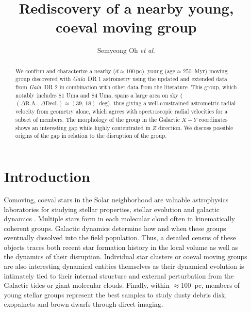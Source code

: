 \documentclass[modern,letterpaper]{aastex61}
\newcommand{\project}[1]{\textsl{#1}}
\newcommand{\gaia}{\project{Gaia}}
\newcommand{\etal}{\textit{et al}.}
\newcommand{\groupDistanceEstimate}{\ensuremath{100~\mathrm{pc}}}
\begin{document}
\sloppy\sloppypar\raggedbottom\frenchspacing %

\title{
  Rediscovery of a nearby young, coeval moving group
}

\author[0000-0001-7790-5308]{Semyeong Oh \etal}


\begin{abstract}

  We confirm and characterize a nearby ($d \approx \groupDistanceEstimate$),
  young (age$\approx 250$~Myr) moving group discovered with \gaia\ DR 1
  astrometry using the updated and extended data from \gaia\ DR 2 in combination
  with other data from the literature.
  This group, which notably includes 81 Uma and 84 Uma, spans a large area
  on sky ($(\Delta\mathrm{R.A.},\,\Delta\mathrm{Decl.})\approx(39,\,18)$~deg),
  thus giving a well-constrained astrometric radial velocity from geometry alone,
  which agrees with spectroscopic radial velocities for a subset of members.
  The morphology of the group in the Galactic $X-Y$ coordinates shows an
  interesting gap while highly contentrated in $Z$ direction.
  We discuss possible origins of the gap in relation to the disruption of the group.

\end{abstract}

\section{Introduction} %
\label{sec:introduction}

Comoving, coeval stars in the Solar neighborhood are valuable astrophysics
laboratories for studying stellar properties, stellar evolution and galactic
dynamics \citep[e.g.,][]{2018arXiv180409378G,2018MNRAS.tmp.1228M}.
Multiple stars form in each molecular cloud often in kinematically coherent
groups.
Galactic dynamics determine how and when these groups eventually  dissolved into
the field population.
Thus, a detailed census of these objects traces both recent star formation
history in the local volume as well as the dynamics of their disruption.
Individual star clusters or coeval moving groups are also interesting dynamical
entities themselves as their dynamical evolution is intimately tied to their
internal structure and external perturbation from the Galactic tides or giant
molecular clouds.
Finally, within $\approx 100$~pc, members of young stellar groups represent the
best samples to study dusty debris disk, exopalnets and brown dwarfs through
direct imaging.
\end{document}
